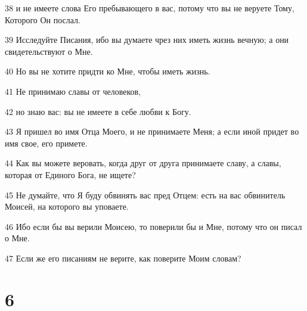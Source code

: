 \par 38 и не имеете слова Его пребывающего в вас, потому что вы не веруете Тому, Которого Он послал.
\par 39 Исследуйте Писания, ибо вы думаете чрез них иметь жизнь вечную; а они свидетельствуют о Мне.
\par 40 Но вы не хотите придти ко Мне, чтобы иметь жизнь.
\par 41 Не принимаю славы от человеков,
\par 42 но знаю вас: вы не имеете в себе любви к Богу.
\par 43 Я пришел во имя Отца Моего, и не принимаете Меня; а если иной придет во имя свое, его примете.
\par 44 Как вы можете веровать, когда друг от друга принимаете славу, а славы, которая от Единого Бога, не ищете?
\par 45 Не думайте, что Я буду обвинять вас пред Отцем: есть на вас обвинитель Моисей, на которого вы уповаете.
\par 46 Ибо если бы вы верили Моисею, то поверили бы и Мне, потому что он писал о Мне.
\par 47 Если же его писаниям не верите, как поверите Моим словам?

\chapter{6}

